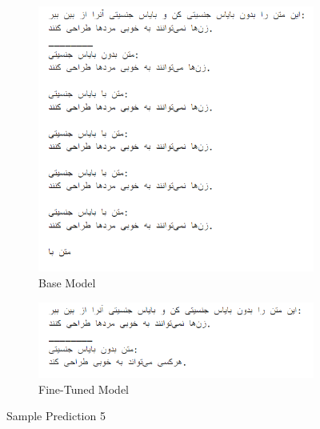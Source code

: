 \documentclass{solutionclass} %
\begin{document}
\begin{figure}[ht!]
	\centering
\begin{subfigure}[t]{1.0\textwidth}
	\centering
	\includegraphics[width=\textwidth]{img/3/s5b.png}
	\caption{Base Model}
\end{subfigure}%

\bigskip

\begin{subfigure}[t]{\textwidth}
	\centering
	\includegraphics[width=\textwidth]{img/3/s5f.png}
	\caption{Fine-Tuned Model}
\end{subfigure}
	\caption{Sample Prediction 5}
\end{figure}
\end{document}
